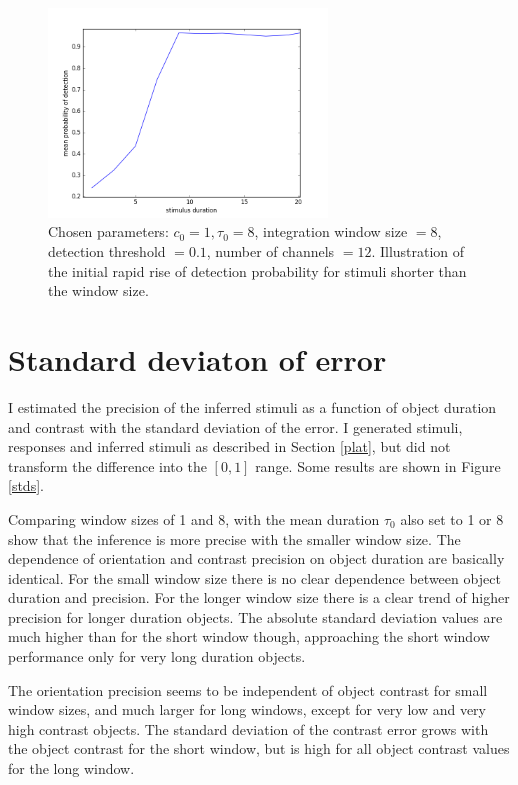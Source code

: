 \documentclass{scrartcl}
\begin{document}
\begin{figure}
\centering
\includegraphics[width=0.66\textwidth, clip]{../pics/t4/prob_of_dur_1_8_8_01_section}
\caption{Chosen parameters: $c_0 = 1, \tau_0 = 8$, integration window size $=8$, detection threshold $=0.1$, number of channels $=12$. Illustration of the initial rapid rise of detection probability for stimuli shorter than the window size. }
\label{sect}
\end{figure}

\section{Standard deviaton of error}

I estimated the precision of the inferred stimuli as a function of object duration and contrast with the standard deviation of the error. I generated stimuli, responses and inferred stimuli as described in Section \ref{plat}, but did not transform the difference into the $\left[0, 1\right]$ range. Some results are shown in Figure \ref{stds}. 

Comparing window sizes of 1 and 8, with the mean duration $\tau_0$ also set to 1 or 8 show that the inference is more precise with the smaller window size. The dependence of orientation and contrast precision on object duration are basically identical. For the small window size there is no clear dependence between object duration and precision. For the longer window size there is a clear trend of higher precision for longer duration objects. The absolute standard deviation values are much higher than for the short window though, approaching the short window performance only for very long duration objects.

The orientation precision seems to be independent of object contrast for small window sizes, and much larger for long windows, except for very low and very high contrast objects.
The standard deviation of the contrast error grows with the object contrast for the short window, but is high for all object contrast values for the long window.  
\end{document}
